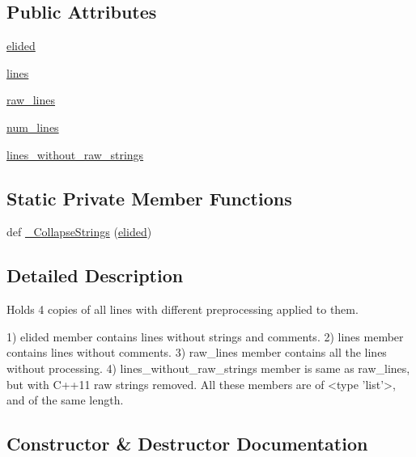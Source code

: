 \subsection*{Public Attributes}
\begin{DoxyCompactItemize}
\item 
\hyperlink{classcpplint_1_1CleansedLines_aa4d0a4d5081675c01656a5d86d99e8bd}{elided}
\item 
\hyperlink{classcpplint_1_1CleansedLines_a9cd74bd010da1610a46322d6821bd06a}{lines}
\item 
\hyperlink{classcpplint_1_1CleansedLines_a9e94ce9e4f682be33c04fe82429c4dfd}{raw\+\_\+lines}
\item 
\hyperlink{classcpplint_1_1CleansedLines_a4b42ab48659954fb6e0a4e4eb483a45a}{num\+\_\+lines}
\item 
\hyperlink{classcpplint_1_1CleansedLines_a0cc228ba3c00ba590b27a759cf8023ce}{lines\+\_\+without\+\_\+raw\+\_\+strings}
\end{DoxyCompactItemize}
\subsection*{Static Private Member Functions}
\begin{DoxyCompactItemize}
\item 
def \hyperlink{classcpplint_1_1CleansedLines_a9c0f1b4c30303351378e058f8c468b55}{\+\_\+\+Collapse\+Strings} (\hyperlink{classcpplint_1_1CleansedLines_aa4d0a4d5081675c01656a5d86d99e8bd}{elided})
\end{DoxyCompactItemize}


\subsection{Detailed Description}
\begin{DoxyVerb}Holds 4 copies of all lines with different preprocessing applied to them.

1) elided member contains lines without strings and comments.
2) lines member contains lines without comments.
3) raw_lines member contains all the lines without processing.
4) lines_without_raw_strings member is same as raw_lines, but with C++11 raw
   strings removed.
All these members are of <type 'list'>, and of the same length.
\end{DoxyVerb}
 

\subsection{Constructor \& Destructor Documentation}
